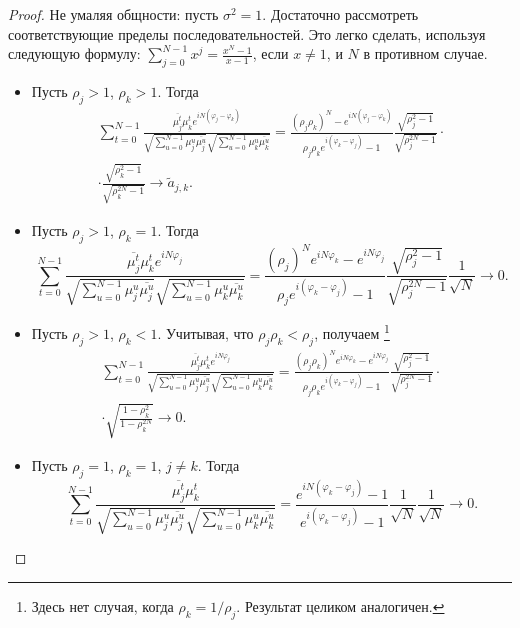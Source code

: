 \documentclass[12pt,a4paper]{article}
\begin{document}
	\begin{proof}
		Не умаляя общности: пусть $\sigma^2 = 1$. Достаточно рассмотреть соответствующие пределы последовательностей. Это легко сделать, используя следующую формулу: $\sum_{j = 0}^{N-1} x^j = \frac{x^N-1}{x-1}$, если $x \ne 1$, и $N$ в противном случае.
		\begin{itemize}
			\item Пусть $\rho_j > 1$, $\rho_k > 1$. Тогда
			\begin{multline*}
			\sum_{t=0}^{N-1} \frac{\overline{\mu_j^t} \mu_k^t e^{i N (\varphi_j - \varphi_k)}}{\sqrt{\sum_{u=0}^{N-1} \mu_j^u \overline{\mu_j^u}} \sqrt{\sum_{u=0}^{N-1} \mu_k^u \overline{\mu_k^u}}} = \frac{(\rho_j \rho_k)^N - e^{i N(\varphi_j - \varphi_k)}}{\rho_j \rho_k e^{i (\varphi_k - \varphi_j)} - 1} \frac{\sqrt{\rho_j^2 - 1}}{\sqrt{\rho_j^{2N} - 1}} \cdot \\ \cdot \frac{\sqrt{\rho_k^2 - 1}}{\sqrt{\rho_k^{2N} - 1}} \to \tilde a_{j, k}.
			\end{multline*}
			
			\item Пусть $\rho_j > 1$, $\rho_k = 1$. Тогда
			\begin{equation*}
			\sum_{t=0}^{N-1} \frac{\overline{\mu_j^t} \mu_k^t e^{i N \varphi_j}}{\sqrt{\sum_{u=0}^{N-1} \mu_j^u \overline{\mu_j^u}} \sqrt{\sum_{u=0}^{N-1} \mu_k^u \overline{\mu_k^u}}} = \frac{(\rho_j )^N e^{i N \varphi_k} - e^{i N \varphi_j}}{\rho_j e^{i (\varphi_k - \varphi_j)} - 1} \frac{\sqrt{\rho_j^2 - 1}}{\sqrt{\rho_j^{2N} - 1}} \frac{1}{\sqrt{N}} \to 0.
			\end{equation*}
			
			\item Пусть $\rho_j > 1$, $\rho_k < 1$. Учитывая, что $\rho_j \rho_k < \rho_j$, получаем \footnote{Здесь нет случая, когда $\rho_k = 1/\rho_j$. Результат целиком аналогичен.}
			\begin{multline*}
			\sum_{t=0}^{N-1} \frac{\overline{\mu_j^t} \mu_k^t e^{i N \varphi_j}}{\sqrt{\sum_{u=0}^{N-1} \mu_j^u \overline{\mu_j^u}} \sqrt{\sum_{u=0}^{N-1} \mu_k^u \overline{\mu_k^u}}} = \frac{(\rho_j \rho_k)^N e^{i N \varphi_k} - e^{i N \varphi_j}}{\rho_j \rho_k e^{i (\varphi_k - \varphi_j)} - 1} \frac{\sqrt{\rho_j^2 - 1}}{\sqrt{\rho_j^{2N} - 1}} \cdot \\ \cdot \sqrt{\frac{1 - \rho_k^2}{1 - \rho_k^{2N}}} \to 0.
			\end{multline*}
			
			\item Пусть $\rho_j = 1$, $\rho_k = 1$, $j \ne k$. Тогда
			\begin{equation*}
			\sum_{t=0}^{N-1} \frac{\overline{\mu_j^t} \mu_k^t}{\sqrt{\sum_{u=0}^{N-1} \mu_j^u \overline{\mu_j^u}} \sqrt{\sum_{u=0}^{N-1} \mu_k^u \overline{\mu_k^u}}} = \frac{e^{i N (\varphi_k -\varphi_j)} - 1}{e^{i (\varphi_k - \varphi_j)} - 1} \frac{1}{\sqrt{N}} \frac{1}{\sqrt{N}} \to 0.
			\end{equation*}
			

\end{itemize}
\end{proof}
\end{document}
